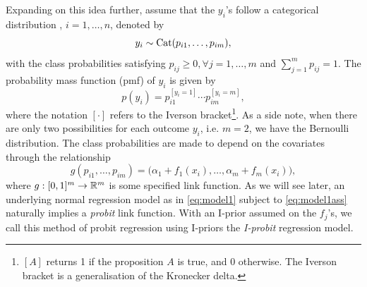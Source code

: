 \documentclass[showframe,11pt,twoside,openright]{report}
\begin{document}
Expanding on this idea further, assume that the $y_i$'s follow a categorical distribution , $i=1,\dots,n$, denoted by 
\[
  y_i \sim \operatorname{Cat}(p_{i1},\dots,p_{im}),
\]
with the class probabilities satisfying $p_{ij} \geq 0, \forall j=1,\dots,m$ and $\sum_{j=1}^m p_{ij} = 1$. 
The probability mass function (pmf) of $y_i$ is given by
\begin{equation*}%
  p(y_i) = p_{i1}^{[y_i = 1]} \cdots p_{im}^{[y_i = m]},
\end{equation*}
where the notation $[\cdot]$ refers to the Iverson bracket\footnote{$[A]$ returns 1 if the proposition $A$ is true, and 0 otherwise. The Iverson bracket is a generalisation of the Kronecker delta.}. 
As a side note, when there are only two possibilities for each outcome $y_i$, i.e. $m=2$, we have the Bernoulli distribution.
The class probabilities are made to depend on the covariates through the relationship
\begingroup
\setlength{\abovedisplayskip}{9pt}
\setlength{\belowdisplayskip}{8pt}
\[
  g(p_{i1},\dots,p_{im}) = \big(\alpha_1 + f_1(x_i), \dots, \alpha_m + f_m(x_i)\big),
\]
\endgroup
where $g:[0,1]^m\to\mathbb{R}^m$ is some specified link function.
As we will see later, an underlying normal regression model as in \cref{eq:model1} subject to \cref{eq:model1ass} naturally implies a \emph{probit} link function.
With an I-prior assumed on the $f_j$'s, we call this method of probit regression using I-priors the \emph{I-probit} regression model.

\end{document}
